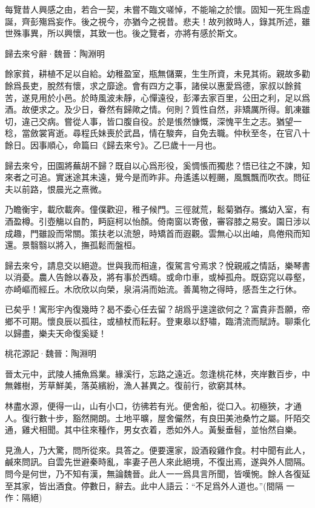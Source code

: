 \documentclass[12pt,a4paper]{ctexbook}
\begin{document}
每覽昔人興感之由，若合一契，未嘗不臨文嗟悼，不能喻之於懷。固知一死生爲虛誕，齊彭殤爲妄作。後之視今，亦猶今之視昔。悲夫！故列敘時人，錄其所述，雖世殊事異，所以興懷，其致一也。後之覽者，亦將有感於斯文。\par
歸去來兮辭·魏晉：陶淵明 \par
餘家貧，耕植不足以自給。幼稚盈室，瓶無儲粟，生生所資，未見其術。親故多勸餘爲長吏，脫然有懷，求之靡途。會有四方之事，諸侯以惠愛爲德，家叔以餘貧苦，遂見用於小邑。於時風波未靜，心憚遠役，彭澤去家百里，公田之利，足以爲酒。故便求之。及少日，眷然有歸歟之情。何則？質性自然，非矯厲所得。飢凍雖切，違己交病。嘗從人事，皆口腹自役。於是悵然慷慨，深愧平生之志。猶望一稔，當斂裳宵逝。尋程氏妹喪於武昌，情在駿奔，自免去職。仲秋至冬，在官八十餘日。因事順心，命篇曰《歸去來兮》。乙巳歲十一月也。\par
歸去來兮，田園將蕪胡不歸？既自以心爲形役，奚惆悵而獨悲？悟已往之不諫，知來者之可追。實迷途其未遠，覺今是而昨非。舟遙遙以輕颺，風飄飄而吹衣。問征夫以前路，恨晨光之熹微。\par
乃瞻衡宇，載欣載奔。僮僕歡迎，稚子候門。三徑就荒，鬆菊猶存。攜幼入室，有酒盈樽。引壺觴以自酌，眄庭柯以怡顏。倚南窗以寄傲，審容膝之易安。園日涉以成趣，門雖設而常關。策扶老以流憩，時矯首而遐觀。雲無心以出岫，鳥倦飛而知還。景翳翳以將入，撫孤鬆而盤桓。\par
歸去來兮，請息交以絕遊。世與我而相違，復駕言兮焉求？悅親戚之情話，樂琴書以消憂。農人告餘以春及，將有事於西疇。或命巾車，或棹孤舟。既窈窕以尋壑，亦崎嶇而經丘。木欣欣以向榮，泉涓涓而始流。善萬物之得時，感吾生之行休。\par
已矣乎！寓形宇內復幾時？曷不委心任去留？胡爲乎遑遑欲何之？富貴非吾願，帝鄉不可期。懷良辰以孤往，或植杖而耘耔。登東皋以舒嘯，臨清流而賦詩。聊乘化以歸盡，樂夫天命復奚疑！\par
桃花源記·魏晉：陶淵明 \par
晉太元中，武陵人捕魚爲業。緣溪行，忘路之遠近。忽逢桃花林，夾岸數百步，中無雜樹，芳草鮮美，落英繽紛，漁人甚異之。復前行，欲窮其林。\par
林盡水源，便得一山，山有小口，彷彿若有光。便舍船，從口入。初極狹，才通人。復行數十步，豁然開朗。土地平曠，屋舍儼然，有良田美池桑竹之屬。阡陌交通，雞犬相聞。其中往來種作，男女衣着，悉如外人。黃髮垂髫，並怡然自樂。\par
見漁人，乃大驚，問所從來。具答之。便要還家，設酒殺雞作食。村中聞有此人，鹹來問訊。自雲先世避秦時亂，率妻子邑人來此絕境，不復出焉，遂與外人間隔。問今是何世，乃不知有漢，無論魏晉。此人一一爲具言所聞，皆嘆惋。餘人各復延至其家，皆出酒食。停數日，辭去。此中人語云：“不足爲外人道也。”(間隔 一作：隔絕)\par
\end{document}
